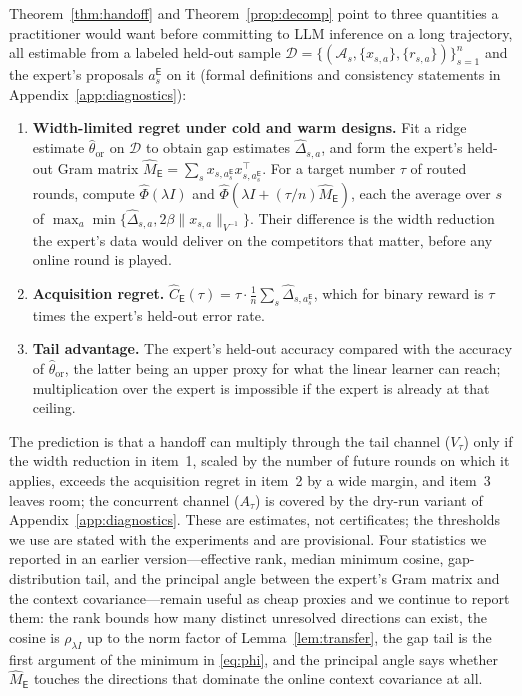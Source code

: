 \documentclass{article}
\theoremstyle{definition}
\theoremstyle{remark}
\theoremstyle{remark}
\newcommand{\Exp}{\mathsf{E}}
\begin{document}
Theorem~\ref{thm:handoff} and Theorem~\ref{prop:decomp} point to three
quantities a practitioner would want before committing to LLM inference on a
long trajectory, all estimable from a labeled held-out sample
$\mathcal D=\{(\mathcal A_s,\{x_{s,a}\},\{r_{s,a}\})\}_{s=1}^{n}$ and the
expert's proposals $a_s^{\Exp}$ on it (formal definitions and consistency
statements in Appendix~\ref{app:diagnostics}):
\begin{enumerate}[itemsep=1pt,topsep=1pt,leftmargin=*]
\item \textbf{Width-limited regret under cold and warm designs.} Fit a ridge
estimate $\widehat\theta_{\mathrm{or}}$ on $\mathcal D$ to obtain gap estimates
$\widehat\Delta_{s,a}$, and form the expert's held-out Gram matrix
$\widehat M_{\Exp}=\sum_sx_{s,a_s^{\Exp}}x_{s,a_s^{\Exp}}^\top$. For a target
number $\tau$ of routed rounds, compute
$\widehat\Phi(\lambda I)$ and $\widehat\Phi(\lambda I+(\tau/n)\widehat M_{\Exp})$,
each the average over $s$ of
$\max_a\min\{\widehat\Delta_{s,a},2\beta\|x_{s,a}\|_{V^{-1}}\}$. Their difference
is the width reduction the expert's data would deliver on the competitors
that matter, before any online round is played.
\item \textbf{Acquisition regret.} $\widehat C_{\Exp}(\tau)=\tau\cdot\frac1n\sum_s\widehat\Delta_{s,a_s^{\Exp}}$,
which for binary reward is $\tau$ times the expert's held-out error rate.
\item \textbf{Tail advantage.} The expert's held-out accuracy compared with
the accuracy of $\widehat\theta_{\mathrm{or}}$, the latter being an upper
proxy for what the linear learner can reach; multiplication over the expert
is impossible if the expert is already at that ceiling.
\end{enumerate}
The prediction is that a handoff can multiply through the tail channel
($V_\tau$) only if the width reduction in item~1, scaled by the number of
future rounds on which it applies, exceeds the acquisition regret in item~2
by a wide margin, and item~3 leaves room; the concurrent channel ($A_\tau$)
is covered by the dry-run variant of Appendix~\ref{app:diagnostics}.
These are estimates, not certificates; the thresholds we use are stated with
the experiments and are provisional. Four statistics we reported in an
earlier version---effective rank, median minimum cosine, gap-distribution tail,
and the principal angle between the expert's Gram matrix and the context
covariance---remain useful as cheap proxies and we continue to report them:
the rank bounds how many distinct unresolved directions can exist, the cosine
is $\rho_{\lambda I}$ up to the norm factor of Lemma~\ref{lem:transfer}, the
gap tail is the first argument of the minimum in \eqref{eq:phi}, and the
principal angle says whether $\widehat M_{\Exp}$ touches the directions that
dominate the online context covariance at all.
\end{document}
